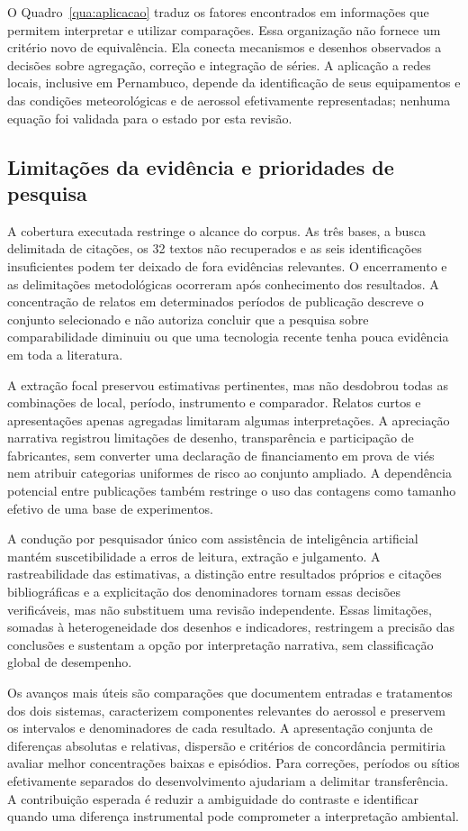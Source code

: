 O Quadro~\ref{qua:aplicacao} traduz os fatores encontrados em informações que permitem interpretar e utilizar comparações. Essa organização não fornece um critério novo de equivalência. Ela conecta mecanismos e desenhos observados a decisões sobre agregação, correção e integração de séries. A aplicação a redes locais, inclusive em Pernambuco, depende da identificação de seus equipamentos e das condições meteorológicas e de aerossol efetivamente representadas; nenhuma equação foi validada para o estado por esta revisão.



\subsection{Limitações da evidência e prioridades de pesquisa}

A cobertura executada restringe o alcance do corpus. As três bases, a busca delimitada de citações, os 32 textos não recuperados e as seis identificações insuficientes podem ter deixado de fora evidências relevantes. O encerramento e as delimitações metodológicas ocorreram após conhecimento dos resultados. A concentração de relatos em determinados períodos de publicação descreve o conjunto selecionado e não autoriza concluir que a pesquisa sobre comparabilidade diminuiu ou que uma tecnologia recente tenha pouca evidência em toda a literatura.

A extração focal preservou estimativas pertinentes, mas não desdobrou todas as combinações de local, período, instrumento e comparador. Relatos curtos e apresentações apenas agregadas limitaram algumas interpretações. A apreciação narrativa registrou limitações de desenho, transparência e participação de fabricantes, sem converter uma declaração de financiamento em prova de viés nem atribuir categorias uniformes de risco ao conjunto ampliado. A dependência potencial entre publicações também restringe o uso das contagens como tamanho efetivo de uma base de experimentos.

A condução por pesquisador único com assistência de inteligência artificial mantém suscetibilidade a erros de leitura, extração e julgamento. A rastreabilidade das estimativas, a distinção entre resultados próprios e citações bibliográficas e a explicitação dos denominadores tornam essas decisões verificáveis, mas não substituem uma revisão independente. Essas limitações, somadas à heterogeneidade dos desenhos e indicadores, restringem a precisão das conclusões e sustentam a opção por interpretação narrativa, sem classificação global de desempenho.

Os avanços mais úteis são comparações que documentem entradas e tratamentos dos dois sistemas, caracterizem componentes relevantes do aerossol e preservem os intervalos e denominadores de cada resultado. A apresentação conjunta de diferenças absolutas e relativas, dispersão e critérios de concordância permitiria avaliar melhor concentrações baixas e episódios. Para correções, períodos ou sítios efetivamente separados do desenvolvimento ajudariam a delimitar transferência. A contribuição esperada é reduzir a ambiguidade do contraste e identificar quando uma diferença instrumental pode comprometer a interpretação ambiental.
